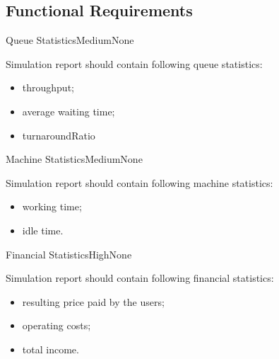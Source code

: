 \subsection*{Functional Requirements}
	\begin{comment}
		$<$Itemize the detailed functional requirements associated with this feature.  
		These are the software capabilities that must be present in order for the user 
		to carry out the services provided by the feature, or to execute the use case.  
		Include how the product should respond to anticipated error conditions or 
		invalid inputs. Requirements should be concise, complete, unambiguous, 
		verifiable, and necessary. Use “TBD” as a placeholder to indicate when necessary 
		information is not yet available.$>$
		
		$<$Each requirement should be uniquely identified with a sequence number or a 
		meaningful tag of some kind.$>$
		
		REQ-1:	REQ-2:
	\end{comment}

	\begin{functional}{Queue Statistics}{Medium}{None}
		\label{fn:reporting-feature:queue-statistics}
		{
			Simulation report should contain following queue statistics:
			\begin{itemize}
				\item \gls{throughput};
				\item average waiting time;
				\item \gls{turnaroundRatio}
			\end{itemize}
		}
	\end{functional}

	\begin{functional}{Machine Statistics}{Medium}{None}
		\label{fn:reporting-feature:machine-statistics}
		{
			Simulation report should contain following machine statistics:
			\begin{itemize}
				\item working time;
				\item idle time.
			\end{itemize}
		}
	\end{functional}

	\begin{functional}{Financial Statistics}{High}{None}
		\label{fn:reporting-feature:financial-statistics}
		{
			Simulation report should contain following financial statistics:
			\begin{itemize}
				\item resulting price paid by the users;
				\item operating costs;
				\item total income.
			\end{itemize}
		}
	\end{functional}

